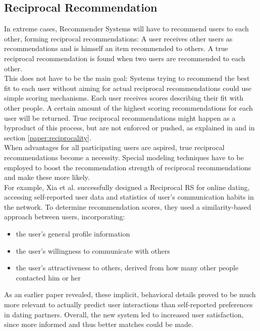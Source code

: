 \documentclass[conference]{IEEEtran}
\begin{document}
\subsection{Reciprocal Recommendation}\label{rw:reciprocalrec}
In extreme cases, Recommender Systems will have to recommend users to each other, forming reciprocal recommendations: A user receives other users as recommendations and is himself an item recommended to others. A true reciprocal recommendation is found when two users are recommended to each other.\\
This does not have to be the main goal: Systems trying to recommend the best fit to each user without aiming for actual reciprocal recommendations could use simple scoring mechanisms. Each user receives scores describing their fit with other people. A certain amount of the highest scoring recommendations for each user will be returned. True reciprocal recommendations might happen as a byproduct of this process, but are not enforced or pushed, as explained in \cite{potts2018reciprocal} and in section \ref{paper:reciprocality}.\\
When advantages for all participating users are aspired, true reciprocal recommendations become a necessity. Special modeling techniques have to be employed to boost the recommendation strength of reciprocal recommendations and make these more likely.\\
For example, Xia et al. successfully designed a Reciprocal RS for online dating, accessing self-reported user data and statistics of user's communication habits in the network. \cite{xia2015reciprocal} To determine recommendation scores, they used a similarity-based approach between users, incorporating:
\begin{itemize}
	\item the user's general profile information
	\item the user's willingness to communicate with others
	\item the user's attractiveness to others, derived from how many other people contacted him or her
\end{itemize}
As an earlier paper revealed, these implicit, behavioral details proved to be much more relevant to actually predict user interactions than self-reported preferences in dating partners. \cite{xia2014characterization} Overall, the new system led to increased user satisfaction, since more informed and thus better matches could be made. \cite{xia2015reciprocal}
\end{document}
